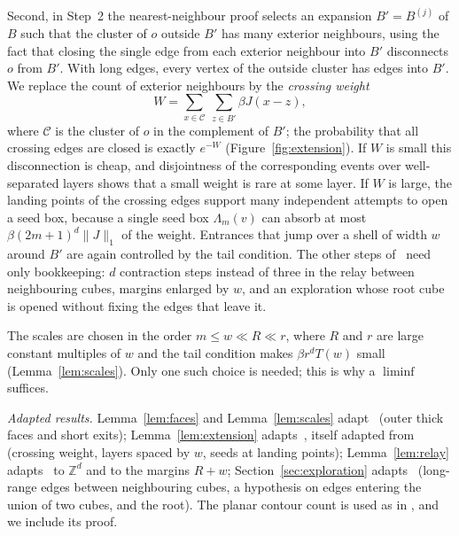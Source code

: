 \documentclass[11pt]{article}
\theoremstyle{definition}
\theoremstyle{remark}
\numberwithin{equation}{section}
\newcommand{\Z}{\mathbb Z}
\newcommand{\1}{\mathbf 1}
\newcommand{\cC}{\mathcal C}
\newcommand{\Lam}{\Lambda}
\newcommand{\norm}[1]{\|#1\|}
\begin{document}
Second, in Step~2 the nearest-neighbour proof selects an expansion $B'=B^{(j)}$ of $B$ such that the
cluster of $o$ outside $B'$ has many exterior neighbours, using the fact that closing the single edge
from each exterior neighbour into $B'$ disconnects $o$ from $B'$. With long edges, every vertex of the
outside cluster has edges into $B'$. We replace the count of exterior neighbours by the
\emph{crossing weight}
\[
W=\sum_{x\in\cC}\ \sum_{z\in B'}\beta J(x-z),
\]
where $\cC$ is the cluster of $o$ in the complement of $B'$; the probability that all crossing edges
are closed is exactly $e^{-W}$ (Figure~\ref{fig:extension}). If $W$ is small this disconnection
is cheap, and disjointness of the corresponding events over well-separated layers shows that a
small weight is rare at some layer. If $W$ is large, the landing points of the crossing edges
support many independent attempts to open a seed box, because a single seed box $\Lam_m(v)$ can
absorb at most $\beta(2m+1)^d\norm{J}_1$ of the weight. Entrances that jump over a shell of width $w$
around $B'$ are again controlled by the tail condition. The other steps of~\cite{OpenAIZ3} need only
bookkeeping: $d$ contraction steps instead of three in the relay between neighbouring cubes, margins
enlarged by $w$, and an exploration whose root cube is opened without fixing the edges that leave it.

The scales are chosen in the order $m\le w\ll R\ll r$, where $R$ and $r$ are large constant
multiples of $w$ and the tail condition makes $\beta r^dT(w)$ small (Lemma~\ref{lem:scales}). Only
one such choice is needed; this is why a $\liminf$ suffices.

\emph{Adapted results.} Lemma~\ref{lem:faces} and Lemma~\ref{lem:scales} adapt~\cite[Lemma~3.3]{OpenAIZ3} (outer thick faces
and short exits); Lemma~\ref{lem:extension} adapts~\cite[Lemma~4.1]{OpenAIZ3}, itself adapted
from~\cite[Lemma~10]{KozmaNitzan2024} (crossing weight, layers spaced by $w$, seeds at landing
points); Lemma~\ref{lem:relay} adapts~\cite[Lemma~5.1]{OpenAIZ3} to $\Z^d$ and to the margins
$R+w$; Section~\ref{sec:exploration} adapts~\cite[\S6, Lemmas~6.1--6.3]{OpenAIZ3} (long-range edges between
neighbouring cubes, a hypothesis on edges entering the union of two cubes, and the root). The planar contour count is used as in
\cite[Lemma~3.1]{OpenAIZ3}, and we include its proof.
\end{document}
